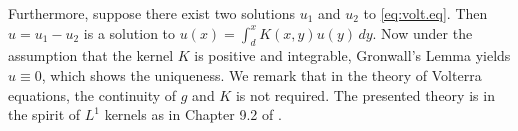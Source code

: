 \documentclass[12pt,reqno]{amsart}
\newcommand{\blue}{\textcolor[rgb]{0.00,0.00,1.00}}
\newtheorem{prop}[theorem]{Proposition}
\theoremstyle{definition}
\theoremstyle{remark}
\newcommand{\p}{\mathbb{P}}
\begin{document}
  
Furthermore, suppose there exist two solutions $u_1$ and $u_2$ to \eqref{eq:volt.eq}. Then $u=u_1-u_2$
is a solution to $u(x)= \int_d^xK(x,y)u(y)\,dy$.
Now under the assumption that the kernel $K$ is positive and integrable, Gronwall's Lemma yields $u\equiv 0$, which shows the uniqueness.
We remark that in {the} theory of Volterra equations, the continuity of $g$ and $K$ is not required.
The presented theory is in the spirit of $L^1$ kernels as in Chapter 9.2 of
\cite{gripenberg}.






%

\begin{comment}
In this case we can make easily the following observation.
Suppose that $-\infty<\inf_{x}\phi(x)$  and  denote $\delta=-\inf_{x}\phi(x)+\epsilon$.
We can rewrite the sde \eqref{sde1} as follows
\begin{eqnarray*}
dU(t)&=&dX(t)-\phi(U(t))\,dt\\
&=&dX(t)+\delta\,dt-(\delta-\phi(U(t)))\,dt\\
dU(t)&=&dX(t)-\tilde{\phi}(U(t))\,dt,
\end{eqnarray*}
where $\tilde{\phi}(x)= \delta-\phi(U(t)) >0$.
Thus without loss of generality we can suppose from now on that $\phi\ge0$.
\end{comment}
\end{document}

